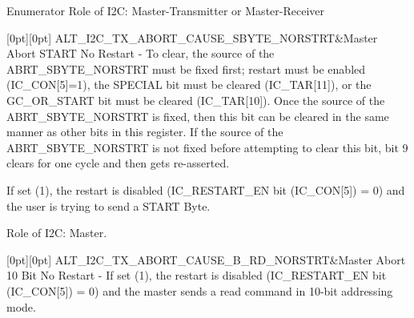 \begin{DoxyEnumFields}{Enumerator}
Role of I2C\+: Master-\/\+Transmitter or Master-\/\+Receiver \\
\hline

[0pt][0pt]{}\mbox{\label{group__ALT__I2C_gga321dbe61df714c442640f1c4a908aabfa8c1f72561a9fd7229a5ab74b9b88286e}} 
A\+L\+T\+\_\+\+I2\+C\+\_\+\+T\+X\+\_\+\+A\+B\+O\+R\+T\+\_\+\+C\+A\+U\+S\+E\+\_\+\+S\+B\+Y\+T\+E\+\_\+\+N\+O\+R\+S\+T\+RT&Master Abort S\+T\+A\+RT No Restart -\/ To clear, the source of the A\+B\+R\+T\+\_\+\+S\+B\+Y\+T\+E\+\_\+\+N\+O\+R\+S\+T\+RT must be fixed first; restart must be enabled (I\+C\+\_\+\+C\+ON\mbox{[}5\mbox{]}=1), the S\+P\+E\+C\+I\+AL bit must be cleared (I\+C\+\_\+\+T\+AR\mbox{[}11\mbox{]}), or the G\+C\+\_\+\+O\+R\+\_\+\+S\+T\+A\+RT bit must be cleared (I\+C\+\_\+\+T\+AR\mbox{[}10\mbox{]}). Once the source of the A\+B\+R\+T\+\_\+\+S\+B\+Y\+T\+E\+\_\+\+N\+O\+R\+S\+T\+RT is fixed, then this bit can be cleared in the same manner as other bits in this register. If the source of the A\+B\+R\+T\+\_\+\+S\+B\+Y\+T\+E\+\_\+\+N\+O\+R\+S\+T\+RT is not fixed before attempting to clear this bit, bit 9 clears for one cycle and then gets re-\/asserted.

If set (1), the restart is disabled (I\+C\+\_\+\+R\+E\+S\+T\+A\+R\+T\+\_\+\+EN bit (I\+C\+\_\+\+C\+ON\mbox{[}5\mbox{]}) = 0) and the user is trying to send a S\+T\+A\+RT Byte.

Role of I2C\+: Master. \\
\hline

[0pt][0pt]{}\mbox{\label{group__ALT__I2C_gga321dbe61df714c442640f1c4a908aabfafb17f88d06d808137c54de64568105d1}} 
A\+L\+T\+\_\+\+I2\+C\+\_\+\+T\+X\+\_\+\+A\+B\+O\+R\+T\+\_\+\+C\+A\+U\+S\+E\+\_\+B\+\_\+\+R\+D\+\_\+\+N\+O\+R\+S\+T\+RT&Master Abort 10 Bit No Restart -\/ If set (1), the restart is disabled (I\+C\+\_\+\+R\+E\+S\+T\+A\+R\+T\+\_\+\+EN bit (I\+C\+\_\+\+C\+ON\mbox{[}5\mbox{]}) = 0) and the master sends a read command in 10-\/bit addressing mode.


\end{DoxyEnumFields}
